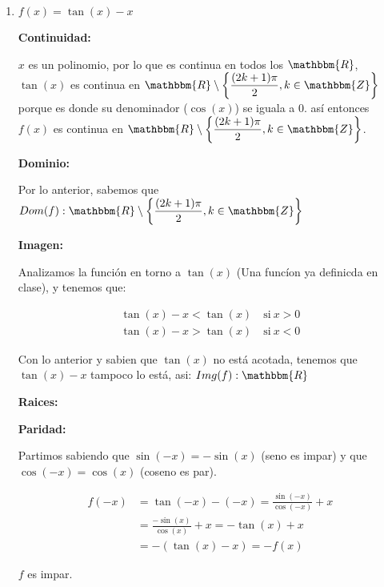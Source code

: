 \documentclass[12pt]{article}
\begin{document}
\begin{enumerate}[\hspace{9px} a)]
    \item \(f(x)=\tan(x)-x\)\bigskip
    
        \textbf{Continuidad: }\medskip

            $x$ es un polinomio, por lo que es continua en todos los $\mathbbm{R}$, \(\tan(x)\) es continua en \(\mathbbm{R}\setminus\displaystyle\left\{\frac{(2k+1)\pi}{2}, k\in\mathbbm{Z}\right\}\) porque es donde su denominador (\(\cos(x)\)) se iguala a 0. as\'i entonces \(f(x)\) es continua en \(\mathbbm{R}\setminus\displaystyle\left\{\frac{(2k+1)\pi}{2}, k\in\mathbbm{Z}\right\}\).\bigskip
        
        \textbf{Dominio: }\medskip
            
            Por lo anterior, sabemos que \(Dom(f):\mathbbm{R}\setminus\displaystyle\left\{\frac{(2k+1)\pi}{2}, k\in\mathbbm{Z}\right\}\)\bigskip

        \textbf{Imagen: }\medskip

            Analizamos la funci\'on en torno a $\tan(x)$ (Una func\'ion ya definicda en clase), y tenemos que:

            \begin{align*}
                \tan(x)-x<\tan(x) \quad \text{si} \ x>0\\
                \tan(x)-x>\tan(x) \quad \text{si} \ x<0
            \end{align*}

            Con lo anterior y sabien que \(\tan(x)\) no est\'a acotada, tenemos que \(\tan(x)-x\) tampoco lo est\'a, asi: \(Img(f): \mathbbm{R}\)\bigskip

        \textbf{Raices: }\medskip

        \textbf{Paridad: }\medskip

            Partimos sabiendo que \(\sin(-x)=-\sin(x)\) (seno es impar) y que \(\cos(-x)=\cos(x)\) (coseno es par).

            \begin{align*}
                f(-x)&=\tan(-x)-(-x)=\frac{\sin(-x)}{\cos(-x)}+x \\
                &= \frac{-\sin(x)}{\cos(x)}+x = -\tan(x)+x \\
                &= -(\tan(x)-x)= -f(x)
            \end{align*}

            $f$ es impar.\bigskip


\end{enumerate}
\end{document}
